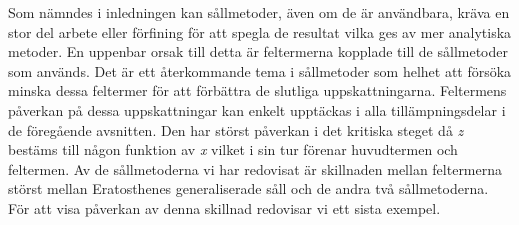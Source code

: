 
Som nämndes i inledningen kan sållmetoder, även om de är användbara, kräva en stor del arbete eller förfining för att spegla de resultat vilka ges av mer analytiska metoder. 
En uppenbar orsak till detta är feltermerna kopplade till de sållmetoder som används. 
Det är ett återkommande tema i sållmetoder som helhet att försöka minska dessa feltermer för att förbättra de slutliga uppskattningarna.
Feltermens påverkan på dessa uppskattningar kan enkelt upptäckas i alla tillämpningsdelar i de föregående avsnitten.
Den har störst påverkan i det kritiska steget då \textit{z} bestäms till någon funktion av \textit{x} vilket i sin tur förenar huvudtermen och feltermen.
Av de sållmetoderna vi har redovisat är skillnaden mellan feltermerna störst mellan Eratosthenes generaliserade såll och de andra två sållmetoderna.
För att visa påverkan av denna skillnad redovisar vi ett sista exempel.

